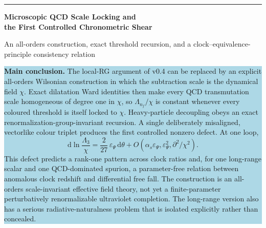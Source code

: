 \documentclass[11pt,a4paper]{article}
\newcommand{\dd}{\mathrm{d}}
\begin{document}

\begin{titlepage}
\thispagestyle{empty}
\vspace*{7mm}

{\color{navy}\rule{\textwidth}{1.2pt}}
\vspace{7mm}

{\fontsize{21}{25}\selectfont\bfseries\color{navy} Microscopic QCD Scale Locking and\\ the First Controlled Chronometric Shear\par}
\vspace{3mm}
{\Large An all-orders construction, exact threshold recursion, and a clock--equivalence-principle consistency relation\par}

\vspace{9mm}

\begin{center}
\begin{minipage}{0.93\textwidth}
\colorbox{lightblue}{\parbox{0.96\textwidth}{
\textbf{Main conclusion.} The local-RG argument of v0.4 can be replaced by an explicit all-orders Wilsonian construction in which the subtraction scale is the dynamical field $\chi$. Exact dilatation Ward identities then make every QCD transmutation scale homogeneous of degree one in $\chi$, so $\Lambda_{n_f}/\chi$ is constant whenever every coloured threshold is itself locked to $\chi$. Heavy-particle decoupling obeys an exact renormalization-group-invariant recursion. A single deliberately misaligned, vectorlike colour triplet produces the first controlled nonzero defect. At one loop,
\[
\dd\ln\frac{\Lambda_3}{\chi}
=\frac{2}{27}\,\varepsilon_\Psi\,\dd\theta+
O(\alpha_s\varepsilon_\Psi,\varepsilon_\Psi^2,\partial^2/\chi^2).
\]
This defect predicts a rank-one pattern across clock ratios and, for one long-range scalar and one QCD-dominated spurion, a parameter-free relation between anomalous clock redshift and differential free fall. The construction is an all-orders scale-invariant effective field theory, not yet a finite-parameter perturbatively renormalizable ultraviolet completion. The long-range version also has a serious radiative-naturalness problem that is isolated explicitly rather than concealed.
}}
\end{minipage}
\end{center}

\vfill


\end{titlepage}
\end{document}
